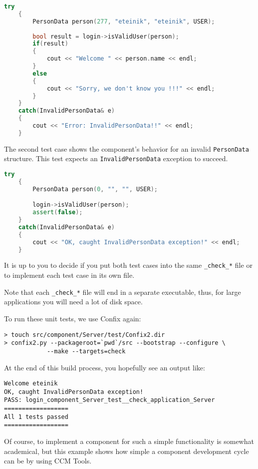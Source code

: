 \begin{footnotesize}
\begin{lstlisting}[language=C++]
    try 
    {
        PersonData person(277, "eteinik", "eteinik", USER);
	
        bool result = login->isValidUser(person);
        if(result) 
        {
            cout << "Welcome " << person.name << endl;
        }
        else 
        {
            cout << "Sorry, we don't know you !!!" << endl;
        }
    }
    catch(InvalidPersonData& e) 
    {
        cout << "Error: InvalidPersonData!!" << endl;
    }
\end{lstlisting}
\end{footnotesize}

The second test case shows the component's behavior for an invalid 
{\tt PersonData} structure. This test expects an {\tt InvalidPersonData}
exception to succeed.

\begin{footnotesize}
\begin{lstlisting}[language=C++]
    try 
    {
        PersonData person(0, "", "", USER);

        login->isValidUser(person);
        assert(false);
    }
    catch(InvalidPersonData& e) 
    {
        cout << "OK, caught InvalidPersonData exception!" << endl;
    }
\end{lstlisting}
\end{footnotesize}

It is up to you to decide if you put both test cases into the same {\tt \_check\_*}
file or to implement each test case in its own file.

\vspace{3mm}
Note that each {\tt \_check\_*} file will end in a separate executable, thus,
for large applications you will need a lot of disk space.

\vspace{3mm}
To run these unit tests, we use Confix again:
\begin{footnotesize}
\begin{verbatim}
> touch src/component/Server/test/Confix2.dir
> confix2.py --packageroot=`pwd`/src --bootstrap --configure \
            --make --targets=check 
\end{verbatim}
\end{footnotesize}

At the end of this build process, you hopefully see an output like:
\begin{footnotesize}
\begin{verbatim}
Welcome eteinik
OK, caught InvalidPersonData exception!
PASS: login_component_Server_test__check_application_Server
==================
All 1 tests passed
==================
\end{verbatim}
\end{footnotesize}

Of course, to implement a component for such a simple functionality is somewhat
academical, but this example shows how simple a component development cycle can
be by using CCM Tools. 

\newpage
